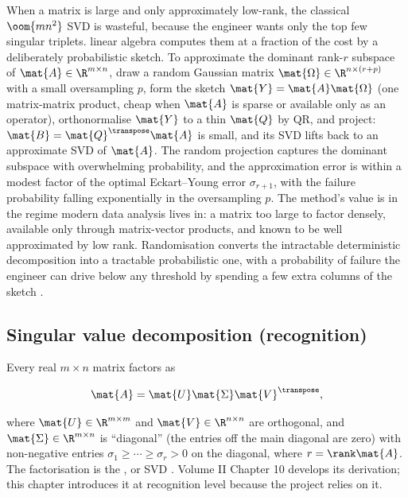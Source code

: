 \begin{mastery}
When a matrix is large and only approximately low-rank, the classical
$\oom{mn^{2}}$ SVD is wasteful, because the engineer wants only the
top few singular triplets.  linear algebra computes
them at a fraction of the cost by a deliberately probabilistic
sketch. To approximate the dominant rank-$r$ subspace of $\mat{A} \in
\R^{m \times n}$, draw a random Gaussian matrix $\mat{\Omega} \in
\R^{n \times (r + p)}$ with a small oversampling $p$, form the sketch
$\mat{Y} = \mat{A}\mat{\Omega}$ (one matrix-matrix product, cheap when
$\mat{A}$ is sparse or available only as an operator), orthonormalise
$\mat{Y}$ to a thin $\mat{Q}$ by QR, and project: $\mat{B} =
\mat{Q}^{\transpose}\mat{A}$ is small, and its SVD lifts back to an
approximate SVD of $\mat{A}$. The random projection captures the
dominant subspace with overwhelming probability, and the
approximation error is within a modest factor of the optimal
Eckart--Young error $\sigma_{r+1}$, with the failure probability
falling exponentially in the oversampling $p$. The method's value is
in the regime modern data analysis lives in: a matrix too large to
factor densely, available only through matrix-vector products, and
known to be well approximated by low rank. Randomisation converts the
intractable deterministic decomposition into a tractable probabilistic
one, with a probability of failure the engineer can drive below any
threshold by spending a few extra columns of the sketch
\cite{paper:v2ch10-eckart-young1936}.
\end{mastery}

\subsection{Singular value decomposition (recognition)}

Every real $m \times n$ matrix factors as

\[
\mat{A} = \mat{U}\mat{\Sigma}\mat{V}^{\transpose},
\]

where $\mat{U} \in \R^{m \times m}$ and $\mat{V} \in \R^{n \times n}$
are orthogonal, and $\mat{\Sigma} \in \R^{m \times n}$ is
``diagonal'' (the entries off the main diagonal are zero) with
non-negative entries $\sigma_{1} \geq \cdots \geq \sigma_{r} > 0$
on the diagonal, where $r = \rank \mat{A}$. The factorisation is the
, or SVD
\cite[ch.~4]{text:trefethen-bau1997}. Volume II Chapter 10 develops
its derivation; this chapter introduces it at recognition level
because the project relies on it.

